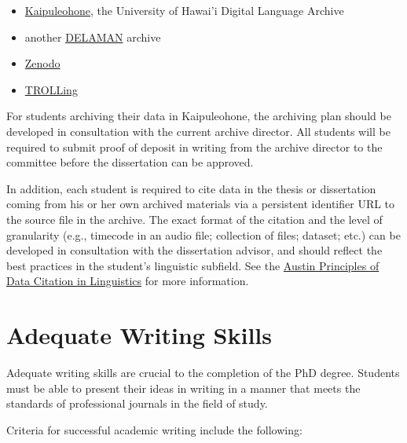 \documentclass[
]{book}
\providecommand{\tightlist}{%
  \setlength{\itemsep}{0pt}\setlength{\parskip}{0pt}}
\begin{document}
\begin{itemize}
\tightlist
\item
  \href{https://hdl.handle.net/10125/4250}{Kaipuleohone}, the University of Hawai'i Digital Language Archive
\item
  another \href{http://www.delaman.org}{DELAMAN} archive
\item
  \href{http://zenodo.org}{Zenodo}
\item
  \href{https://trolling.uit.no/}{TROLLing}
\end{itemize}

For students archiving their data in Kaipuleohone, the archiving plan should be developed in consultation with the current archive director. All students will be required to submit proof of deposit in writing from the archive director to the committee before the dissertation can be approved.

In addition, each student is required to cite data in the thesis or dissertation coming from his or her own archived materials via a persistent identifier URL to the source file in the archive. The exact format of the citation and the level of granularity (e.g., timecode in an audio file; collection of files; dataset; etc.) can be developed in consultation with the dissertation advisor, and should reflect the best practices in the student's linguistic subfield. See the \href{https://site.uit.no/linguisticsdatacitation/}{Austin Principles of Data Citation in Linguistics} for more information.

\hypertarget{writing}{%
\section{Adequate Writing Skills}\label{writing}}

Adequate writing skills are crucial to the completion of the PhD degree. Students must be able to present their ideas in writing in a manner that meets the standards of professional journals in the field of study.

Criteria for successful academic writing include the following:
\end{document}

